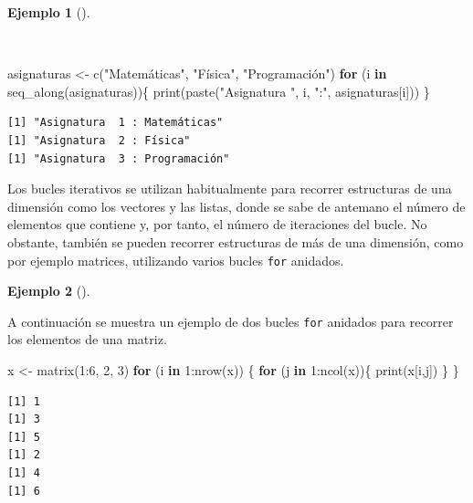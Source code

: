\documentclass[
  spanish,
  a4paper,
]{scrreport}
\newenvironment{Shaded}{\begin{snugshade}}{\end{snugshade}}
\newcommand{\ControlFlowTok}[1]{\textcolor[rgb]{0.00,0.23,0.31}{\textbf{#1}}}
\newcommand{\DecValTok}[1]{\textcolor[rgb]{0.68,0.00,0.00}{#1}}
\newcommand{\FunctionTok}[1]{\textcolor[rgb]{0.28,0.35,0.67}{#1}}
\newcommand{\NormalTok}[1]{\textcolor[rgb]{0.00,0.23,0.31}{#1}}
\newcommand{\OtherTok}[1]{\textcolor[rgb]{0.00,0.23,0.31}{#1}}
\newcommand{\SpecialCharTok}[1]{\textcolor[rgb]{0.37,0.37,0.37}{#1}}
\newcommand{\StringTok}[1]{\textcolor[rgb]{0.13,0.47,0.30}{#1}}
\theoremstyle{definition}
\theoremstyle{definition}
\newtheorem{example}{Ejemplo}[chapter]
\theoremstyle{remark}
\begin{document}
\begin{example}[]\protect\hypertarget{exm-bucle-iterativo-posicion}{}\label{exm-bucle-iterativo-posicion}

~

\begin{Shaded}
\begin{Highlighting}[]
\NormalTok{asignaturas }\OtherTok{\textless{}{-}} \FunctionTok{c}\NormalTok{(}\StringTok{"Matemáticas"}\NormalTok{, }\StringTok{"Física"}\NormalTok{, }\StringTok{"Programación"}\NormalTok{)}
\ControlFlowTok{for}\NormalTok{ (i }\ControlFlowTok{in} \FunctionTok{seq\_along}\NormalTok{(asignaturas))\{}
  \FunctionTok{print}\NormalTok{(}\FunctionTok{paste}\NormalTok{(}\StringTok{"Asignatura "}\NormalTok{, i, }\StringTok{":"}\NormalTok{, asignaturas[i]))}
\NormalTok{\}}
\end{Highlighting}
\end{Shaded}

\begin{verbatim}
[1] "Asignatura  1 : Matemáticas"
[1] "Asignatura  2 : Física"
[1] "Asignatura  3 : Programación"
\end{verbatim}

\end{example}

Los bucles iterativos se utilizan habitualmente para recorrer
estructuras de una dimensión como los vectores y las listas, donde se
sabe de antemano el número de elementos que contiene y, por tanto, el
número de iteraciones del bucle. No obstante, también se pueden recorrer
estructuras de más de una dimensión, como por ejemplo matrices,
utilizando varios bucles \texttt{for} anidados.

\begin{example}[]\protect\hypertarget{exm-bucles-anidados}{}\label{exm-bucles-anidados}

A continuación se muestra un ejemplo de dos bucles \texttt{for} anidados
para recorrer los elementos de una matriz.

\begin{Shaded}
\begin{Highlighting}[]
\NormalTok{x }\OtherTok{\textless{}{-}} \FunctionTok{matrix}\NormalTok{(}\DecValTok{1}\SpecialCharTok{:}\DecValTok{6}\NormalTok{, }\DecValTok{2}\NormalTok{, }\DecValTok{3}\NormalTok{)}
\ControlFlowTok{for}\NormalTok{ (i }\ControlFlowTok{in} \DecValTok{1}\SpecialCharTok{:}\FunctionTok{nrow}\NormalTok{(x)) \{}
  \ControlFlowTok{for}\NormalTok{ (j }\ControlFlowTok{in} \DecValTok{1}\SpecialCharTok{:}\FunctionTok{ncol}\NormalTok{(x))\{}
    \FunctionTok{print}\NormalTok{(x[i,j])}
\NormalTok{  \}}
\NormalTok{\}}
\end{Highlighting}
\end{Shaded}

\begin{verbatim}
[1] 1
[1] 3
[1] 5
[1] 2
[1] 4
[1] 6
\end{verbatim}

\end{example}
\end{document}

